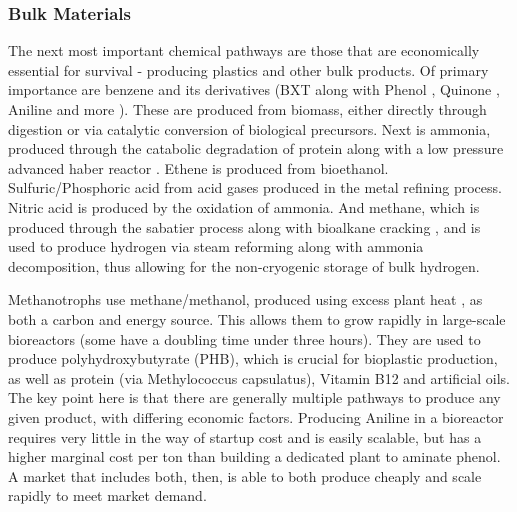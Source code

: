 \documentclass[fleqn,10pt]{Stylesheet} %
\begin{document}

\subsubsection{Bulk Materials}
\label{sec:necessities_bulk}


The next most important chemical pathways are those that are economically essential for survival - producing plastics and other bulk products. Of primary importance are benzene and its derivatives (BXT \cite{QingfengChe2019} along with Phenol \cite{2001Gibson}, Quinone \cite{NingqingRan2001}, Aniline \cite{Pharkya2020} and more \cite{JianLi2017}). These are produced from biomass, either directly through digestion or via catalytic conversion of biological precursors. Next is ammonia, produced through the catabolic degradation of protein \cite{KwonYoungChoi2014} along with a low pressure advanced haber reactor \cite{BosongLin2019}. Ethene is produced from bioethanol. Sulfuric/Phosphoric acid from acid gases produced in the metal refining process. Nitric acid is produced by the oxidation of ammonia. And methane, which is produced through the sabatier \cite{JohnBucknell2014} process along with  bioalkane cracking \cite{2004JoseComas, XWang2002}, and is used to produce hydrogen via steam reforming \cite{JianhuaTong2006} along with ammonia decomposition, thus allowing for the non-cryogenic storage of bulk hydrogen. 

Methanotrophs use methane/methanol, produced using excess plant heat , as both a carbon and energy source. This allows them to grow rapidly in large-scale bioreactors (some have a doubling time under three hours). They are used to produce polyhydroxybutyrate (PHB), which is crucial for bioplastic production, as well as protein (via Methylococcus capsulatus), Vitamin B12 and artificial oils.
The key point here is that there are generally multiple pathways to produce any given product, with differing economic factors. Producing Aniline in a bioreactor requires very little in the way of startup cost and is easily scalable, but has a higher marginal cost per ton than building a dedicated plant to aminate phenol. A market that includes both, then, is able to both produce cheaply and scale rapidly to meet market demand.
\end{document}
